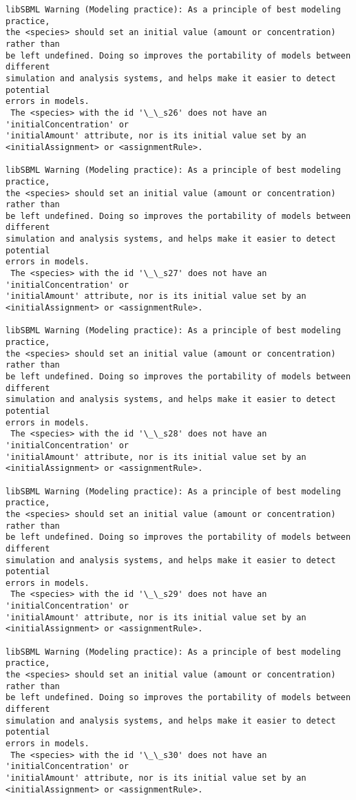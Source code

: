\documentclass[11pt]{article}
\begin{document}
\begin{Verbatim}[commandchars=\\\{\}]
libSBML Warning (Modeling practice): As a principle of best modeling practice,
the <species> should set an initial value (amount or concentration) rather than
be left undefined. Doing so improves the portability of models between different
simulation and analysis systems, and helps make it easier to detect potential
errors in models.
 The <species> with the id '\_\_s26' does not have an 'initialConcentration' or
'initialAmount' attribute, nor is its initial value set by an
<initialAssignment> or <assignmentRule>.

libSBML Warning (Modeling practice): As a principle of best modeling practice,
the <species> should set an initial value (amount or concentration) rather than
be left undefined. Doing so improves the portability of models between different
simulation and analysis systems, and helps make it easier to detect potential
errors in models.
 The <species> with the id '\_\_s27' does not have an 'initialConcentration' or
'initialAmount' attribute, nor is its initial value set by an
<initialAssignment> or <assignmentRule>.

libSBML Warning (Modeling practice): As a principle of best modeling practice,
the <species> should set an initial value (amount or concentration) rather than
be left undefined. Doing so improves the portability of models between different
simulation and analysis systems, and helps make it easier to detect potential
errors in models.
 The <species> with the id '\_\_s28' does not have an 'initialConcentration' or
'initialAmount' attribute, nor is its initial value set by an
<initialAssignment> or <assignmentRule>.

libSBML Warning (Modeling practice): As a principle of best modeling practice,
the <species> should set an initial value (amount or concentration) rather than
be left undefined. Doing so improves the portability of models between different
simulation and analysis systems, and helps make it easier to detect potential
errors in models.
 The <species> with the id '\_\_s29' does not have an 'initialConcentration' or
'initialAmount' attribute, nor is its initial value set by an
<initialAssignment> or <assignmentRule>.

libSBML Warning (Modeling practice): As a principle of best modeling practice,
the <species> should set an initial value (amount or concentration) rather than
be left undefined. Doing so improves the portability of models between different
simulation and analysis systems, and helps make it easier to detect potential
errors in models.
 The <species> with the id '\_\_s30' does not have an 'initialConcentration' or
'initialAmount' attribute, nor is its initial value set by an
<initialAssignment> or <assignmentRule>.


\end{Verbatim}
\end{document}
